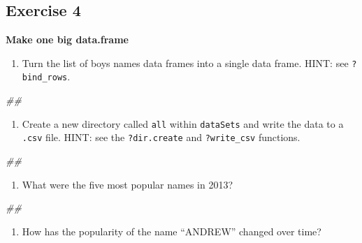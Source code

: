 \documentclass[]{book}
\newenvironment{Shaded}{\begin{snugshade}}{\end{snugshade}}
\newcommand{\CommentTok}[1]{\textcolor[rgb]{0.56,0.35,0.01}{\textit{#1}}}
\providecommand{\tightlist}{%
  \setlength{\itemsep}{0pt}\setlength{\parskip}{0pt}}
\begin{document}
\hypertarget{exercise-4-1}{%
\subsection{Exercise 4}\label{exercise-4-1}}

\textbf{Make one big data.frame}

\begin{enumerate}
\def\labelenumi{\arabic{enumi}.}
\tightlist
\item
  Turn the list of boys names data frames into a single data frame. HINT: see \texttt{?bind\_rows}.
\end{enumerate}

\begin{Shaded}
\begin{Highlighting}[]
\CommentTok{## }
\end{Highlighting}
\end{Shaded}

\begin{enumerate}
\def\labelenumi{\arabic{enumi}.}
\setcounter{enumi}{1}
\tightlist
\item
  Create a new directory called \texttt{all} within \texttt{dataSets} and write the data to a \texttt{.csv} file.
  HINT: see the \texttt{?dir.create} and \texttt{?write\_csv} functions.
\end{enumerate}

\begin{Shaded}
\begin{Highlighting}[]
\CommentTok{## }
\end{Highlighting}
\end{Shaded}

\begin{enumerate}
\def\labelenumi{\arabic{enumi}.}
\setcounter{enumi}{2}
\tightlist
\item
  What were the five most popular names in 2013?
\end{enumerate}

\begin{Shaded}
\begin{Highlighting}[]
\CommentTok{## }
\end{Highlighting}
\end{Shaded}

\begin{enumerate}
\def\labelenumi{\arabic{enumi}.}
\setcounter{enumi}{3}
\tightlist
\item
  How has the popularity of the name ``ANDREW'' changed over time?
\end{enumerate}
\end{document}

